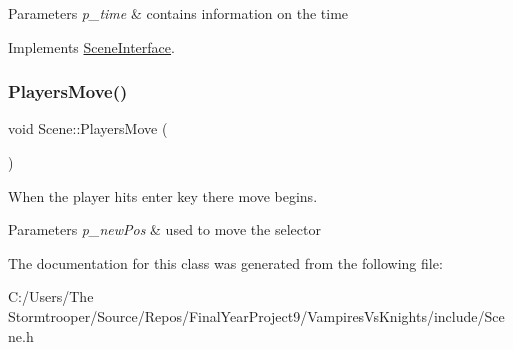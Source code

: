 \begin{DoxyParams}{Parameters}
{\em p\+\_\+time} & contains information on the time \\
\hline
\end{DoxyParams}


Implements \mbox{\hyperlink{class_scene_interface_a54c0b8784bcb2278aeb9b6030df9a158}{Scene\+Interface}}.

\mbox{\label{class_scene_a33e61bb927aa8a3e1070a907ffff24a5}} 
\subsubsection{\texorpdfstring{Players\+Move()}{PlayersMove()}}
{\footnotesize\ttfamily void Scene\+::\+Players\+Move (\begin{DoxyParamCaption}{ }\end{DoxyParamCaption})}



When the player hits enter key there move begins. 


\begin{DoxyParams}{Parameters}
{\em p\+\_\+new\+Pos} & used to move the selector \\
\hline
\end{DoxyParams}


The documentation for this class was generated from the following file\+:\begin{DoxyCompactItemize}
\item 
C\+:/\+Users/\+The Stormtrooper/\+Source/\+Repos/\+Final\+Year\+Project9/\+Vampires\+Vs\+Knights/include/Scene.\+h\end{DoxyCompactItemize}
